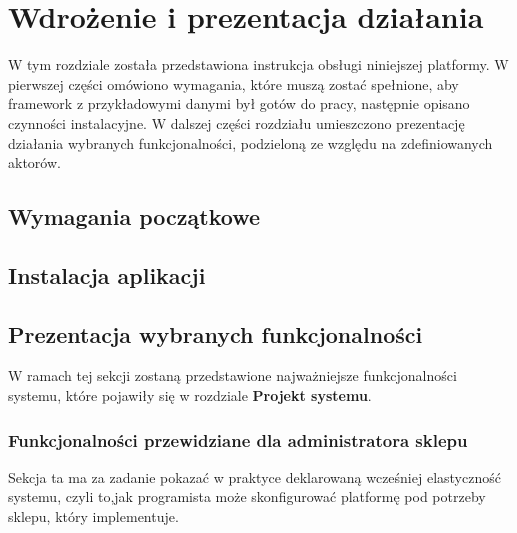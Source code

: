\chapter{Wdrożenie i prezentacja działania}
\thispagestyle{chapterBeginStyle}

W tym rozdziale została przedstawiona instrukcja obsługi niniejszej platformy. W pierwszej części omówiono wymagania, które muszą zostać spełnione, aby framework z przykładowymi danymi był gotów do pracy, następnie opisano czynności instalacyjne. 
W dalszej części rozdziału umieszczono prezentację działania wybranych funkcjonalności, podzieloną ze względu na zdefiniowanych aktorów. 

\section{Wymagania początkowe}

\section{Instalacja aplikacji}

\section{Prezentacja wybranych funkcjonalności}

W ramach tej sekcji zostaną przedstawione najważniejsze funkcjonalności systemu, które pojawiły się w rozdziale \textbf{Projekt systemu}.  

\subsection{Funkcjonalności przewidziane dla administratora sklepu}
Sekcja ta ma za zadanie pokazać w praktyce deklarowaną wcześniej elastyczność systemu, czyli to,jak programista może skonfigurować platformę pod potrzeby sklepu, który implementuje.

